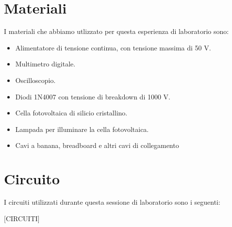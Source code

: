 \section*{Materiali}

I materiali che abbiamo utlizzato per questa esperienza di laboratorio sono:

\begin{itemize}
    \setlength{\itemsep}{0.5pt}
    \item{Alimentatore di tensione continua, con tensione massima di 50 V.}
    \item{Multimetro digitale.}
    \item{Oscilloscopio.}
    \item{Diodi 1N4007 con tensione di breakdown di 1000 V.}
    \item{Cella fotovoltaica di silicio cristallino.}
    \item{Lampada per illuminare la cella fotovoltaica.}
    \item{Cavi a banana, breadboard e altri cavi di collegamento}
\end{itemize}

\section*{Circuito}

I circuiti utilizzati durante questa sessione di laboratorio sono i seguenti:

[CIRCUITI]
